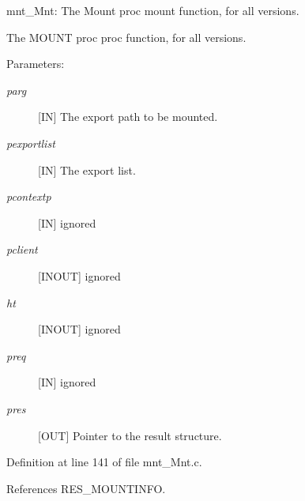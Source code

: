 mnt\_\-Mnt: The Mount proc mount function, for all versions.

The MOUNT proc proc function, for all versions.

\begin{Desc}
\item[Parameters:]
\begin{description}
\item[{\em parg}][IN] The export path to be mounted. \item[{\em pexportlist}][IN] The export list. \item[{\em pcontextp}][IN] ignored \item[{\em pclient}][INOUT] ignored \item[{\em ht}][INOUT] ignored \item[{\em preq}][IN] ignored \item[{\em pres}][OUT] Pointer to the result structure. \end{description}
\end{Desc}


Definition at line 141 of file mnt\_\-Mnt.c.

References RES\_\-MOUNTINFO.